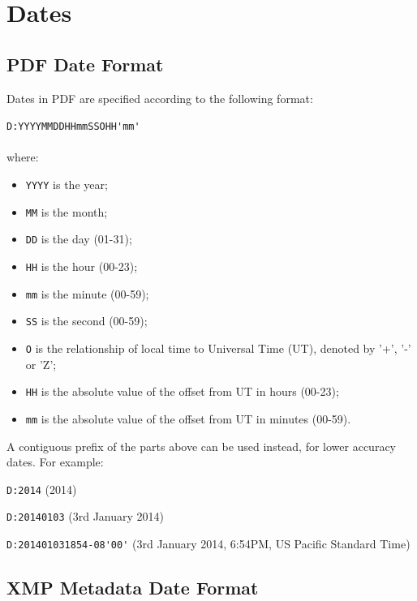 \documentclass{book}
\begin{document}
\appendix
\chapter{Dates}\pagestyle{empty}
\label{dates}

\section{PDF Date Format}
Dates in PDF are specified according to the following format:

\begin{framed}
\verb!D:YYYYMMDDHHmmSSOHH'mm'!\\\\where:

\begin{itemize}
  \item \texttt{YYYY} is the year;
  \item \texttt{MM} is the month;
  \item \texttt{DD} is the day (01-31);
  \item \texttt{HH} is the hour (00-23);
  \item \texttt{mm} is the minute (00-59);
  \item \texttt{SS} is the second (00-59);
  \item \texttt{O} is the relationship of local time to Universal Time (UT), denoted by '+', '-' or 'Z';
  \item \texttt{HH} is the absolute value of the offset from UT in hours (00-23);
  \item \texttt{mm} is the absolute value of the offset from UT in minutes (00-59).
\end{itemize}
\end{framed}

\noindent A contiguous prefix of the parts above can be used instead, for lower
accuracy dates. For example:

\begin{framed}
   \small\noindent\verb!D:2014! (2014)
   
   \vspace{1.5mm}
   \noindent\verb!D:20140103! (3rd January 2014)

   \vspace{1.5mm}
   \noindent\verb!D:201401031854-08'00'! (3rd January 2014, 6:54PM, US Pacific Standard Time)
   
\end{framed}

\section{XMP Metadata Date Format}
\label{xmpdate}
\end{document}
